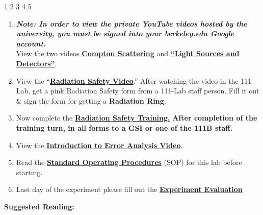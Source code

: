 \documentclass{../lab}
\begin{document}
\signatures \hyperlink{Optimal Energy Range}{1} \hyperlink{Apparatus Safety}{2} \hyperlink{Data Collection}{3} \hyperlink{Radiation Flux}{4} \hyperlink{Over-the-Weekend Measurement}{5} 

\begin{enumerate}
    \item \emph{\textbf{Note: In order to view the private YouTube videos hosted by the university, you must be signed into your berkeley.edu Google account.}} \\
    View the two videos \href{http://youtu.be/PVgqyf3kNRs}{\textbf{Compton Scattering}} and \href{http://youtu.be/lQKLakISoBA}{\textbf{``Light Sources and Detectors''}}.

    \item View the ``\href{http://youtu.be/KHxtzF5pZZM}{\textbf{Radiation Safety Video}}.'' After watching the video in the 111-Lab, get a pink Radiation Safety form from a 111-Lab staff person. Fill it out \& sign the form for getting a \textbf{Radiation Ring}.

    \item Now complete the \href{https://berkeley-physics111b.github.io/safety/radiation/}{\textbf{Radiation Safety Training.}} \textbf{After completion of the training turn, in all forms to a GSI or one of the 111B staff.}

    \item View the \href{\ErrorAnalysisVideo}{\textbf{Introduction to Error Analysis Video}}.

    \item Read the \href{https://berkeley-physics111b.github.io/assets/pdf/oldwebsitestructure/images/SOP\_3271\_Cs-137\_Na-22\_Co-60\_Mn-54\_Am-241\_Fe-55\_2014.pdf}{\textbf{Standard Operating Procedures}} (SOP) for this lab before starting.

    \item Last day of the experiment please fill out the \href{\ExperimentEvaluation}{\textbf{Experiment Evaluation}}

\end{enumerate}

\textbf{Suggested Reading:}
\end{document}
